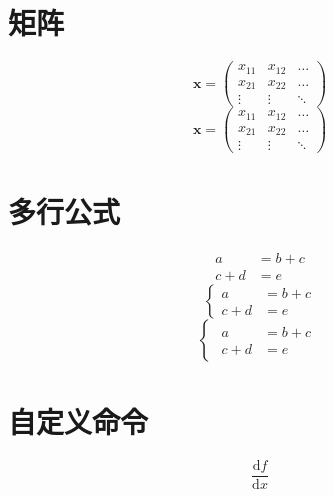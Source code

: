 \documentclass[12pt]{article}
\begin{document}
\section{矩阵}
\begin{displaymath}
	\mathbf{x} =
	\left(\begin{array}{ccc}
			x_{11} & x_{12} & \ldots \\
			x_{21} & x_{22} & \ldots \\
			\vdots & \vdots & \ddots
		\end{array}\right)
\end{displaymath}
\begin{displaymath}
	\mathbf{x}=
	\begin{pmatrix}
		x_{11} & x_{12} & \ldots \\
		x_{21} & x_{22} & \ldots \\
		\vdots & \vdots & \ddots
	\end{pmatrix}
\end{displaymath}
\section{多行公式}
\begin{align}
	a     & = b + c \\
	c + d & = e
\end{align}
\begin{equation}
	\left\{
	\begin{aligned}
		a     & = b + c \\
		c + d & = e
	\end{aligned}
	\right.
\end{equation}
\begin{equation}
	\begin{cases}
		\begin{aligned}
			a     & = b + c \\
			c + d & = e
		\end{aligned}
	\end{cases}
\end{equation}
\section{自定义命令}
\newcommand{\ud}{\mathrm{d}}
\newcommand{\dif}[2]{\frac{\ud {#1}}{\ud {#2}}}
\[ \dif fx \]
\end{document}
